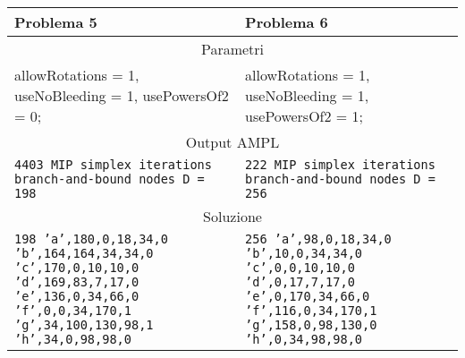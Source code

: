 \begin{table}[H]
\centering
\footnotesize
\begin{tabular}{p{6cm}|p{6cm}}
\textbf{Problema 5} & \textbf{Problema 6} \\
\hline
\multicolumn{2}{|c|}{Parametri} \\ 
\hline
allowRotations = 1,\newline
useNoBleeding = 1,\newline
usePowersOf2 = 0;	& 
allowRotations = 1,\newline
useNoBleeding = 1,\newline
usePowersOf2 = 1;	\\
\hline
\multicolumn{2}{|c|}{Output AMPL} \\
\hline
\texttt{4403 MIP simplex iterations\newline
1423 branch-and-bound nodes\newline
D = 198}
&
\texttt{222 MIP simplex iterations\newline
0 branch-and-bound nodes\newline
D = 256}
\\
\hline
\multicolumn{2}{|c|}{Soluzione} \\
\hline
\texttt{198\newline
'a',180,0,18,34,0\newline
'b',164,164,34,34,0\newline
'c',170,0,10,10,0\newline
'd',169,83,7,17,0\newline
'e',136,0,34,66,0\newline
'f',0,0,34,170,1\newline
'g',34,100,130,98,1\newline
'h',34,0,98,98,0}
&
\texttt{256\newline
'a',98,0,18,34,0\newline
'b',10,0,34,34,0\newline
'c',0,0,10,10,0\newline
'd',0,17,7,17,0\newline
'e',0,170,34,66,0\newline
'f',116,0,34,170,1\newline
'g',158,0,98,130,0\newline
'h',0,34,98,98,0}
\\
\end{tabular}
\end{table}































